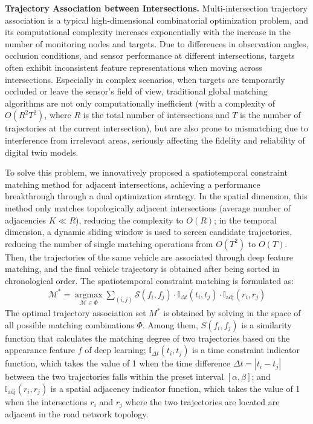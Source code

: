 \documentclass[journal,twoside,web]{ieeecolor}
\begin{document}
\textbf{Trajectory Association between Intersections.}
Multi-intersection trajectory association is a typical high-dimensional combinatorial optimization problem, and its computational complexity increases exponentially with the increase in the number of monitoring nodes and targets.
Due to differences in observation angles, occlusion conditions, and sensor performance at different intersections, targets often exhibit inconsistent feature representations when moving across intersections.
Especially in complex scenarios, when targets are temporarily occluded or leave the sensor's field of view, traditional global matching algorithms are not only computationally inefficient (with a complexity of \(O(R^2 T^2)\), where \(R\) is the total number of intersections and \(T\)  is the number of trajectories at the current intersection), but are also prone to mismatching due to interference from irrelevant areas, seriously affecting the fidelity and reliability of digital twin models.

To solve this problem, we innovatively proposed a spatiotemporal constraint matching method for adjacent intersections, achieving a performance breakthrough through a dual optimization strategy.
In the spatial dimension, this method only matches topologically adjacent intersections (average number of adjacencies \(K \ll R\)), reducing the complexity to \(O(R)\); in the temporal dimension, a dynamic sliding window is used to screen candidate trajectories, reducing the number of single matching operations from \(O(T^2)\) to \(O(T)\).
Then, the trajectories of the same vehicle are associated through deep feature matching, and the final vehicle trajectory is obtained after being sorted in chronological order.
The spatiotemporal constraint matching is formulated as:
\begin{align}
	\mathcal{M}^{*} = \underset{\mathcal{M} \in \Phi}{\operatorname{argmax}} \sum_{(i, j)} \mathcal{S}(f_{i}, f_{j}) \cdot \mathbb{I}_{\Delta t}(t_{i}, t_{j}) \cdot \mathbb{I}_{\mathrm{adj}}(r_{i}, r_{j})
\end{align}
The optimal trajectory association set \(M^{*}\) is obtained by solving in the space of all possible matching combinations \(\Phi\).
Among them, \(S(f_{i}, f_{j})\) is a similarity function that calculates the matching degree of two trajectories based on the appearance feature \(f\) of deep learning; \(\mathbb{I}_{\Delta t}(t_{i}, t_{j})\) is a time constraint indicator function, which takes the value of 1 when the time difference \(\Delta t = |t_i - t_j|\) between the two trajectories falls within the preset interval \([\alpha, \beta]\); and \(\mathbb{I}_{\text{adj}}(r_{i}, r_{j})\) is a spatial adjacency indicator function, which takes the value of 1 when the intersections \(r_{i}\) and \(r_{j}\) where the two trajectories are located are adjacent in the road network topology.
\end{document}
